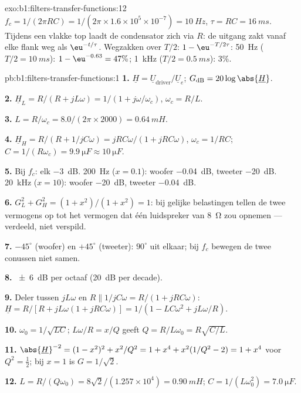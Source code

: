 \begin{solution}{exo:b1:filters-transfer-functions:12}
$f_c = 1/(2\pi RC) = 1/(2\pi \times 1.6\times10^5 \times 10^{-7}) =
\qty{10}{Hz}$, $\tau = RC = \qty{16}{ms}$. Tijdens een vlakke top laadt de
condensator zich via $R$: de uitgang zakt vanaf elke flank weg als $\eu^{-t/\tau}$.
Wegzakken over $T/2$: $1 - \eu^{-T/2\tau}$: \qty{50}{Hz}
($T/2 = \qty{10}{ms}$): $1 - \eu^{-0.63} = 47\%$; \qty{1}{kHz}
($T/2 = \qty{0.5}{ms}$): $3\%$.
\end{solution}

\begin{solution}{pb:b1:filters-transfer-functions:1}
\textbf{1.} $\underline H = \underline U_{\text{driver}}/\underline U_e$;
$G_{\mathrm{dB}} = 20\log\abs{\underline H}$.

\textbf{2.} $\underline H_L = R/(R + jL\omega) = 1/(1 + j\omega/\omega_c)$,
$\omega_c = R/L$.

\textbf{3.} $L = R/\omega_c = 8.0/(2\pi \times 2000) = \qty{0.64}{mH}$.

\textbf{4.} $\underline H_H = R/(R + 1/jC\omega) = jRC\omega/(1 + jRC\omega)$,
$\omega_c = 1/RC$; $C = 1/(R\omega_c) = \qty{9.9}{\micro F} \approx
\qty{10}{\micro F}$.

\textbf{5.} Bij $f_c$: elk \qty{-3}{dB}. \qty{200}{Hz} ($x = 0.1$): woofer
\qty{-0.04}{dB}, tweeter \qty{-20}{dB}. \qty{20}{kHz} ($x = 10$): woofer
\qty{-20}{dB}, tweeter \qty{-0.04}{dB}.

\textbf{6.} $G_L^2 + G_H^2 = (1 + x^2)/(1 + x^2) = 1$: bij gelijke belastingen
tellen de twee vermogens op tot het vermogen dat één luidspreker van \qty{8}{\ohm}
zou opnemen --- verdeeld, niet verspild.

\textbf{7.} $-45^\circ$ (woofer) en $+45^\circ$ (tweeter): $90^\circ$
uit elkaar; bij $f_c$ bewegen de twee conussen niet samen.

\textbf{8.} \qty{\pm 6}{dB} per octaaf (\qty{20}{dB} per decade).

\textbf{9.} Deler tussen $jL\omega$ en $R \parallel 1/jC\omega =
R/(1 + jRC\omega)$: $\underline H = R/[R + jL\omega(1 + jRC\omega)] =
1/(1 - LC\omega^2 + jL\omega/R)$.

\textbf{10.} $\omega_0 = 1/\sqrt{LC}$; $L\omega/R = x/Q$ geeft $Q =
R/L\omega_0 = R\sqrt{C/L}$.

\textbf{11.} $\abs{\underline H}^{-2} = (1 - x^2)^2 + x^2/Q^2 = 1 + x^4 +
x^2(1/Q^2 - 2) = 1 + x^4$ voor $Q^2 = \tfrac12$; bij $x = 1$ is $G = 1/\sqrt2$.

\textbf{12.} $L = R/(Q\omega_0) = 8\sqrt2/(1.257\times10^4) = \qty{0.90}{mH}$;
$C = 1/(L\omega_0^2) = \qty{7.0}{\micro F}$.


\end{solution}
